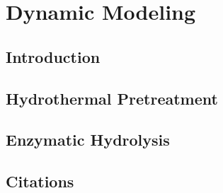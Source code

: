 \chapter{Dynamic Modeling}
\section{Introduction}
\lipsum


\section{Hydrothermal Pretreatment}
\lipsum


\section{Enzymatic Hydrolysis}
\lipsum

\section{Citations}
\cite{Prunescu2012}

\cite{Prunescu2013}

\cite{Prunescu2013a}

\cite{Prunescu2013b}

\cite{Prunescu2015}